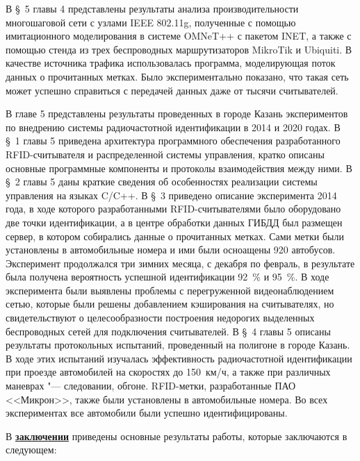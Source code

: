 В \S~5 главы 4 представлены результаты анализа производительности многошаговой сети с узлами IEEE 802.11g, полученные с помощью имитационного моделирования в системе OMNeT++ с пакетом INET, а также с помощью стенда из трех беспроводных маршрутизаторов MikroTik и Ubiquiti. В качестве источника трафика использовалась программа, моделирующая поток данных о прочитанных метках. Было экспериментально показано, что такая сеть может успешно справиться с передачей данных даже от тысячи считывателей.





В главе 5 представлены результаты проведенных в городе Казань экспериментов по внедрению системы радиочастотной идентификации в 2014 и 2020 годах. В \S~1 главы 5 приведена архитектура программного обеспечения разработанного RFID-считывателя и распределенной системы управления, кратко описаны основные программные компоненты и протоколы взаимодействия между ними. В \S~2 главы 5 даны краткие сведения об особенностях реализации системы управления на языках C/C++. В \S~3 приведено описание эксперимента 2014 года, в ходе которого разработанными RFID-считывателями было оборудовано две точки идентификации, а в центре обработки данных ГИБДД был размещен сервер, в котором собирались данные о прочитанных метках. Сами метки были установлены в автомобильные номера и ими были осноащены 920 автобусов. Эксперимент продолжался три зимних месяца, с декабря по февраль, в результате была получена вероятность успешной идентификации 92~\% и 95~\%. В ходе эксперимента были выявлены проблемы с перегруженной видеонаблюдением сетью, которые были решены добавлением кэширования на считывателях, но свидетельствуют о целесообразности построения недорогих выделенных беспроводных сетей для подключения считывателей. В \S~4 главы 5 описаны результаты протокольных испытаний, проведенный на полигоне в городе Казань. В ходе этих испытаний изучалась эффективность радиочастотной идентификации при проезде автомобилей на скоростях до 150~км/ч, а также при различных маневрах "--- следовании, обгоне. RFID-метки, разработанные ПАО <<Микрон>>, также были установлены в автомобильные номера. Во всех экспериментах все автомобили были успешно идентифицированы.

\FloatBarrier
{}                                  %
В \underline{\textbf{заключении}} приведены основные результаты работы, которые заключаются в следующем:



